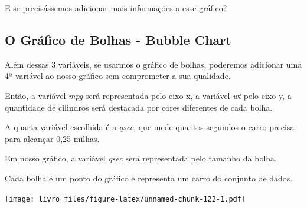 \documentclass[
]{book}
\newenvironment{Shaded}{\begin{snugshade}}{\end{snugshade}}
\newcommand{\CommentTok}[1]{\textcolor[rgb]{0.56,0.35,0.01}{\textit{#1}}}
\newcommand{\DataTypeTok}[1]{\textcolor[rgb]{0.13,0.29,0.53}{#1}}
\newcommand{\DecValTok}[1]{\textcolor[rgb]{0.00,0.00,0.81}{#1}}
\newcommand{\FloatTok}[1]{\textcolor[rgb]{0.00,0.00,0.81}{#1}}
\newcommand{\KeywordTok}[1]{\textcolor[rgb]{0.13,0.29,0.53}{\textbf{#1}}}
\newcommand{\NormalTok}[1]{#1}
\newcommand{\OperatorTok}[1]{\textcolor[rgb]{0.81,0.36,0.00}{\textbf{#1}}}
\newcommand{\StringTok}[1]{\textcolor[rgb]{0.31,0.60,0.02}{#1}}
\begin{document}
E se precisássemos adicionar mais informações a esse gráfico?

\hypertarget{o-gruxe1fico-de-bolhas---bubble-chart}{%
\subsection{O Gráfico de Bolhas - Bubble
Chart}\label{o-gruxe1fico-de-bolhas---bubble-chart}}

Além dessas 3 variáveis, se usarmos o gráfico de bolhas, poderemos
adicionar uma 4ª variável ao nosso gráfico sem comprometer a sua
qualidade.

Então, a variável \emph{mpg} será representada pelo eixo x, a variável
\emph{wt} pelo eixo y, a quantidade de cilindros será destacada por
cores diferentes de cada bolha.

A quarta variável escolhida é a \emph{qsec}, que mede quantos segundos o
carro precisa para alcançar 0,25 milhas.

Em nosso gráfico, a variável \emph{qsec} será representada pelo tamanho
da bolha.

Cada bolha é um ponto do gráfico e representa um carro do conjunto de
dados.

\begin{Shaded}
\end{Shaded}

\texttt{[image: livro\_files/figure-latex/unnamed-chunk-122-1.pdf]}
\end{document}
